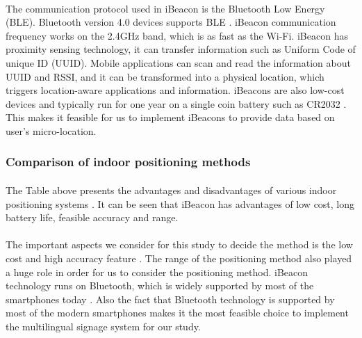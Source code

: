 \documentclass[12pt]{article}
\begin{document}
\paragraph{}The communication protocol used in iBeacon is the Bluetooth Low Energy (BLE). Bluetooth version 4.0 devices supports BLE \cite{indoor}. iBeacon communication frequency works on the 2.4GHz band, which is as fast as the Wi-Fi. iBeacon has proximity sensing technology, it can transfer information such as Uniform Code of unique ID (UUID). Mobile applications can scan and read the information about UUID and RSSI, and it can be transformed into a physical location, which triggers location-aware applications and information. iBeacons are also low-cost devices and typically run for one year on a single coin battery such as CR2032 \cite{audioBeacon}. This makes it feasible for us to implement iBeacons to provide data based on user's micro-location.

\subsubsection{Comparison of indoor positioning methods}
\paragraph{} The Table above presents the advantages and disadvantages of various indoor positioning systems \cite{sensing}. It can be seen that iBeacon has advantages of low cost, long battery life, feasible accuracy and range. %

\paragraph{}The important aspects we consider for this study to decide the method is the low cost and high accuracy feature \cite{sensing}. The range of the positioning method also played a huge role in order for us to consider the positioning method. iBeacon technology runs on Bluetooth, which is widely supported by most of the smartphones today \cite{audioBeacon}. Also the fact that Bluetooth technology is supported by most of the modern smartphones \cite{indoor} makes it the most feasible choice to implement the multilingual signage system for our study. 
 
\end{document}
